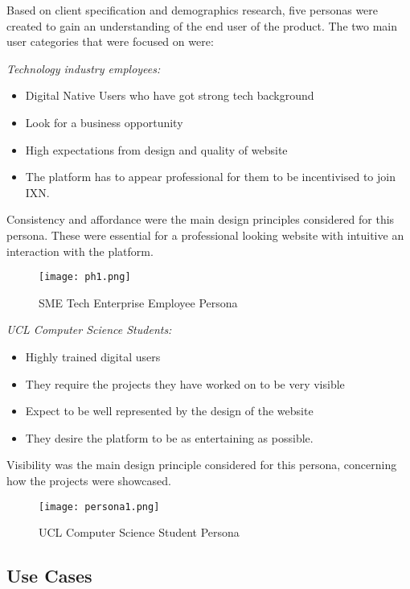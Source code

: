 \documentclass[fontsize=11pt]{extarticle}
\numberwithin{figure}{section} %
\numberwithin{table}{section}%
\providecommand{\tightlist}{%
  \setlength{\itemsep}{0pt}\setlength{\parskip}{0pt}}
\begin{document}
Based on client specification and demographics research, five personas
were created to gain an understanding of the end user of the product.
The two main user categories that were focused on were: ​

\emph{Technology industry employees:}​

\begin{itemize}
\tightlist
\item
  Digital Native Users who have got strong tech background​
\item
  Look for a business opportunity​
\item
  High expectations from design and quality of website​
\item
  The platform has to appear professional for them to be incentivised to
  join IXN​.
\end{itemize}

Consistency and affordance were the main design principles considered
for this persona. These were essential for a professional looking
website ​with intuitive an interaction with the platform. ​

\begin{figure}[H]
      \centering
      \texttt{[image: ph1.png]}
      \caption{SME Tech Enterprise Employee Persona}
\end{figure}

\emph{UCL Computer Science Students: ​}

\begin{itemize}
\tightlist
\item
  Highly trained digital users​
\item
  They require the projects they have worked on to be very visible​
\item
  Expect to be well represented by the design of the website​
\item
  They desire the platform to be as entertaining as possible. ​
\end{itemize}

Visibility was the main design principle considered for this persona,
concerning how the projects were showcased. ​

\begin{figure}[H]
      \centering
      \texttt{[image: persona1.png]}
      \caption{UCL Computer Science Student Persona}
\end{figure}

\hypertarget{use-cases}{%
\subsection{Use Cases}\label{use-cases}}
\end{document}
